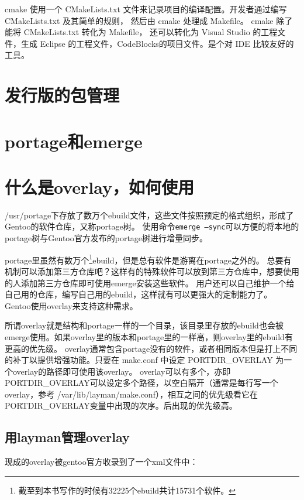 cmake 使用一个 CMakeLists.txt 文件来记录项目的编译配置。开发者通过编写 CMakeLists.txt 及其简单的规则， 然后由 cmake 处理成 Makefile。 cmake 除了能将 CMakeLists.txt 转化为 Makefile， 还可以转化为 Visual Studio 的工程文件，生成 Eclipse 的工程文件，CodeBlocks的项目文件。是个对 IDE 比较友好的 工具。



\section{发行版的包管理}\label{section:pkgmgr}
\section{portage和emerge}\label{sec:emerge}

\section{什么是overlay，如何使用}\label{sec:overlay}

/usr/portage下存放了数万个ebuild文件，这些文件按照预定的格式组织，形成了Gentoo的软件仓库，又称portage树。
使用命令{\tt emerge --sync}可以方便的将本地的portage树与Gentoo官方发布的portage树进行增量同步。

portage里虽然有数万个\footnote{截至到本书写作的时候有32225个ebuild共计15731个软件。}ebuild，但是总有软件是游离在portage之外的。
总要有机制可以添加第三方仓库吧？这样有的特殊软件可以放到第三方仓库中，想要使用的人添加第三方仓库即可使用emerge安装这些软件。
用户还可以自己维护一个给自己用的仓库，编写自己用的ebuild，这样就有可以更强大的定制能力了。
Gentoo使用overlay来支持这种需求。

所谓overlay就是结构和portage一样的一个目录，该目录里存放的ebuild也会被emerge使用。如果overlay里的版本和portage里的一样高，则overlay里的ebuild有更高的优先级。
overlay通常包含portage没有的软件，或者相同版本但是打上不同的补丁以提供增强功能。只要在 make.conf 中设定 PORTDIR\_OVERLAY 为一个overlay的路径即可使用该overlay。
overlay可以有多个，亦即PORTDIR\_OVERLAY可以设定多个路径，以空白隔开（通常是每行写一个overlay，参考 /var/lib/layman/make.conf），相互之间的优先级看它在PORTDIR\_OVERLAY变量中出现的次序。后出现的优先级高。

\subsection{用layman管理overlay}

现成的overlay被gentoo官方收录到了一个xml文件中：


